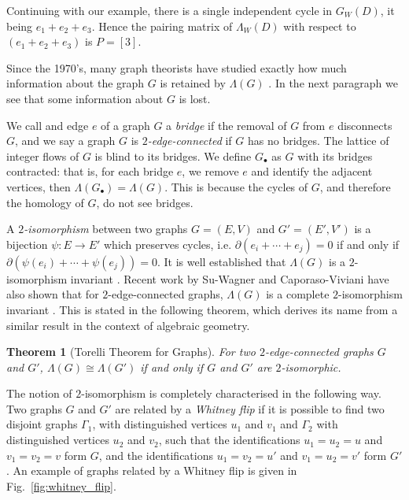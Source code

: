 \documentclass[12pt]{report}
\newtheorem*{theorem}{Theorem}
\theoremstyle{upright}
\begin{document}
Continuing with our example, there is a single independent cycle in $G_{W}(D)$, it being $e_{1} + e_{2} + e_{3}$. Hence the pairing matrix of $\Lambda_{W}(D)$ with respect to $( e_{1} + e_{2} + e_{3})$ is $P = [3]$.

Since the 1970's, many graph theorists have studied exactly how much information about the graph $G$ is retained by $\Lambda(G)$ \parencite{lattice-of-flows-cuts, torelli-for-graphs-tropical-curves, lattice-of-flows-regular-matroid}. In the next paragraph we see that some information about $G$ is lost.

We call and edge $e$ of a graph $G$ a \textit{bridge} if the removal of $G$ from $e$ disconnects $G$, and we say a graph $G$ is \textit{$2$-edge-connected} if $G$ has no bridges. The lattice of integer flows of $G$ is blind to its bridges. We define $G_{\bullet}$ as $G$ with its bridges contracted: that is, for each bridge $e$, we remove $e$ and identify the adjacent vertices, then $\Lambda(G_{\bullet}) = \Lambda(G)$. This is because the cycles of $G$, and therefore the homology of $G$, do not see bridges.

A \textit{$2$-isomorphism} between two graphs $G = (E, V)$ and $G' = (E', V')$ is a bijection \({\psi: E \longrightarrow E'}\) which preserves cycles, i.e. $\partial(e_{i} + \cdots + e_{j}) = 0$ if and only if $\partial\left(\psi(e_{i}) + \cdots + \psi(e_{j})\right) = 0$. It is well established that $\Lambda(G)$ is a $2$-isomorphism invariant \parencite{lattice-of-flows-cuts}. Recent work by Su-Wagner and Caporaso-Viviani have also shown that for $2$-edge-connected graphs, $\Lambda(G)$ is a complete $2$-isomorphism invariant \cites[Theorem 3.1.1]{torelli-for-graphs-tropical-curves}[Theorem 1]{lattice-of-flows-regular-matroid}. This is stated in the following theorem, which derives its name from a similar result in the context of algebraic geometry.


\begin{theorem}[Torelli Theorem for Graphs]
For two $2$-edge-connected graphs $G$ and $G'$, $\Lambda(G) \cong \Lambda(G')$ if and only if $G$ and $G'$ are $2$-isomorphic.
\end{theorem}

The notion of $2$-isomorphism is completely characterised in the following way. Two graphs $G$ and $G'$ are related by a \textit{Whitney flip} if it is possible to find two disjoint graphs $\Gamma_{1}$, with distinguished vertices $u_{1}$ and $v_{1}$ and $\Gamma_{2}$ with distinguished vertices $u_{2}$ and $v_{2}$, such that the identifications $u_{1} = u_{2} = u$ and $v_{1} = v_{2} = v$ form $G$, and the identifications $u_{1} = v_{2} = u'$ and $v_{1} = u_{2} = v'$ form $G'$. An example of graphs related by a Whitney flip is given in Fig.~\ref{fig:whitney_flip}.
\end{document}
